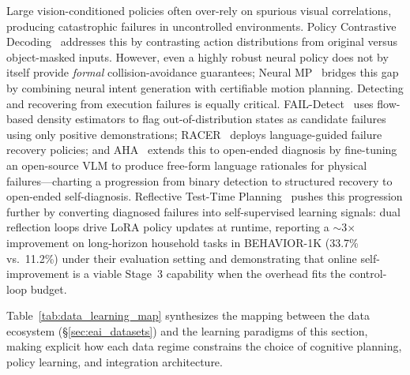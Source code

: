 \documentclass[acmsmall,screen,review,anonymous]{acmart}
\begin{document}
Large vision-conditioned policies often over-rely on spurious visual correlations, producing catastrophic failures in uncontrolled environments. Policy Contrastive Decoding~\cite{wu2026policycontrastive} addresses this by contrasting action distributions from original versus object-masked inputs. However, even a highly robust neural policy does not by itself provide \emph{formal} collision-avoidance guarantees; Neural MP~\cite{dalal2024neuralmp} bridges this gap by combining neural intent generation with certifiable motion planning. Detecting and recovering from execution failures is equally critical. FAIL-Detect~\cite{xu2025detectfailures} uses flow-based density estimators to flag out-of-distribution states as candidate failures using only positive demonstrations; RACER~\cite{dai2024racer} deploys language-guided failure recovery policies; and AHA~\cite{duan2024aha} extends this to open-ended diagnosis by fine-tuning an open-source VLM to produce free-form language rationales for physical failures---charting a progression from binary detection to structured recovery to open-ended self-diagnosis. Reflective Test-Time Planning~\cite{hong2026rttp} pushes this progression further by converting diagnosed failures into self-supervised learning signals: dual reflection loops drive LoRA policy updates at runtime, reporting a $\sim$3$\times$ improvement on long-horizon household tasks in BEHAVIOR-1K (33.7\% vs.\ 11.2\%) under their evaluation setting and demonstrating that online self-improvement is a viable Stage~3 capability when the overhead fits the control-loop budget.

Table~\ref{tab:data_learning_map} synthesizes the mapping between the data ecosystem (\S\ref{sec:eai_datasets}) and the learning paradigms of this section, making explicit how each data regime constrains the choice of cognitive planning, policy learning, and integration architecture.
\end{document}
